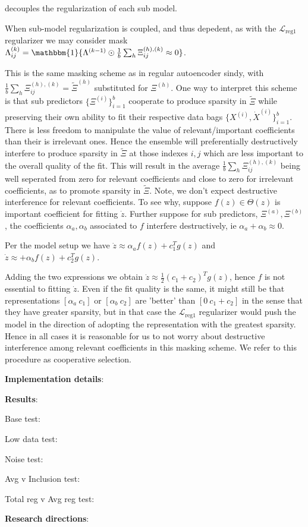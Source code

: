 \documentclass[11pt]{article}
\newcommand{\bs}{{\bigskip}}
\newcommand{\indi}{\mathbbm{1}}
\newcommand{\tb}{\textbf}
\begin{document}
  decouples the regularization of each sub model.  
  
When sub-model regularization is coupled,  and thus depedent,  as with the $ \mathcal{L}_\text{reg1}$ regularizer we may consider 
mask
$\Lambda ^{(k)}_{ij} = \indi\{\Lambda ^{(k-1)} \odot \frac{1}{b}\sum_{h} 
\Xi^{(h),(k)}_{ij} \approx 0\}$.

This is the same masking scheme as in regular autoencoder sindy,  with 
$\frac{1}{b}\sum_{h} \Xi^{(h),(k)}_{ij} = \tilde{\Xi}^{(h)}$ substituted for $\Xi^{(h)}$.  One way to interpret this scheme is that sub predictors
$\{\Xi^{(i)}\}_{i=1}^{b}$ cooperate to produce sparsity in $\tilde{\Xi}$ while preserving their own ability to fit their respective data bags 
$\{X^{(i)}, \dot{X}^{(i)}\}_{i=1}^{b}$.  There is less freedom to manipulate the value of relevant/important coefficients than their is irrelevant ones.  Hence the ensemble will preferentially destructively interfere to produce sparsity in $\tilde{\Xi}$ at those indexes $i,j$ which are less important to the overall quality of the fit.  This will result in the average $\frac{1}{b}\sum_{h} \Xi^{(h),(k)}_{ij}$ being well seperated from zero for relevant coefficients and close to zero for irrelevant coefficients, as to promote sparsity in $\tilde{\Xi}$.    Note,  we don't expect destructive interference for relevant coefficients.  To see why,  suppose $f(z) \in \Theta(z) $ is important coefficient for fitting $\dot{z}$.   Further suppose for sub predictors,  $\Xi^{(a)}, \Xi^{(b)}$,  the coefficients $\alpha_a,  \alpha_b$ associated to $f$ interfere destructively,  ie $\alpha_a +  \alpha_b \approx 0$.  

Per the model setup we have
$\dot{z} \approx \alpha_a f(z) + c_1^Tg(z)$ and 
$\dot{z} \approx + \alpha_b f(z) +  c_2^Tg(z)$.  

Adding the two expressions we obtain $\dot{z}   \approx \frac{1}{2}(c_1+c_2)^Tg(z)$,  hence $f$ is not essential to fitting $\dot{z}$.    Even if the fit quality is the same,  it might still be that representations $[\alpha_a \: c_1]$ or $[\alpha_b \: c_2]$ are 'better' than $[0 \: c_1 + c_2]$ in the sense that they have  greater sparsity, but in that case the $\mathcal{L}_\text{reg1}$ regularizer would push the model in the direction of adopting the representation with the greatest sparsity.   Hence in all cases it is reasonable for us to not worry about destructive interference among relevant coefficients in this masking scheme. We refer to this procedure as cooperative selection.
  
  \pagebreak
  
  \tb{Implementation details}:

  
 \pagebreak
 
  
 \tb{Results}:
 
 Base test:
 
 \bs
 
 Low data test:
 
 
  \bs
 
 Noise test:
 
 
  \bs
 
 Avg v Inclusion test:
 
 
  \bs
 
 Total reg v Avg reg test:
 
  \bs
 
 \pagebreak
 
 
 \tb{Research directions}:
  
  
  
  \pagebreak
  
\end{document}
